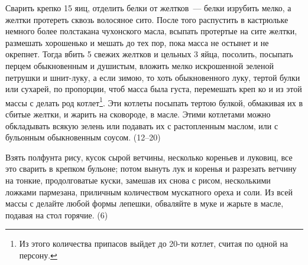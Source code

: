 
Сварить крепко 15 яиц, отделить белки от желтков~--- белки изрубить мелко, а желтки протереть сквозь волосяное сито. После того распустить в кастрюльке немного более полстакана чухонского масла, всыпать протертые на сите желтки, размешать хорошенько и мешать до тех пор, пока масса не остынет и не окрепнет. Тогда вбить 5 свежих желтков и цельных 3 яйца, посолить, посыпать перцем обыкновенным и душистым, вложить мелко искрошенной зеленой петрушки и шнит-луку, а если зимою, то хоть обыкновенного луку, тертой булки или сухарей, по пропорции, чтоб масса была густа, перемешать креп ко и из этой массы с делать род котлет\footnote{Из этого количества припасов выйдет до 20-ти котлет, считая по одной на персону.}. Эти котлеты посыпать тертою булкой, обмакивая их в сбитые желтки, и жарить на сковороде, в масле. Этими котлетами можно обкладывать всякую зелень или подавать их с растопленным маслом, или с бульонным обыкновенным соусом. (12--20) 


Взять полфунта рису, кусок сырой ветчины, несколько кореньев и луковиц, все это сварить в крепком бульоне; потом вынуть лук и коренья и разрезать ветчину на тонкие, продолговатые куски, замешав их снова с рисом, несколькими ложками пармезана, приличным количеством мускатного ореха и соли. Из всей массы с делайте любой формы лепешки, обваляйте в муке и жарьте в масле, подавая на стол горячие. (6)
